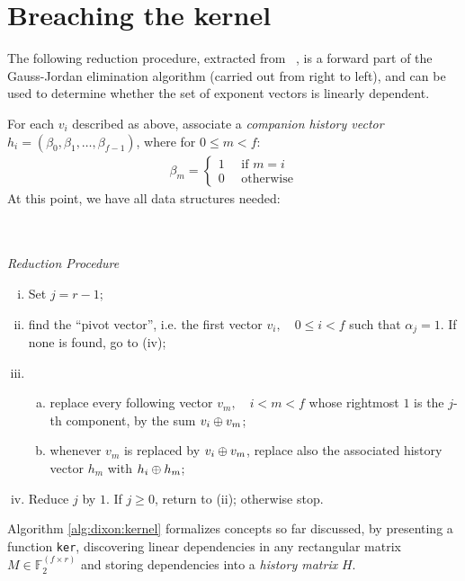 \section{Breaching the kernel}

The following reduction procedure, extracted from ~\cite{morrison-brillhart}, is
a forward part of the Gauss-Jordan elimination algorithm (carried out from right
to left), and can be used to determine whether the set of exponent vectors is
linearly dependent.

For each $v_i$ described as above, associate a \emph{companion history vector} \\
$h_i = (\beta_0, \beta_1, \ldots, \beta_{f-1})$, where for $0 \leq m < f$:
\begin{align*}
  \beta_m = \begin{cases}
    1 \quad \text{ if $m = i$} \\
    0 \quad \text{ otherwise}
    \end{cases}
\end{align*}
At this point, we have all data structures needed:
\\
\\
\\

\begin{center}
  \emph{Reduction Procedure}
\end{center}
\begin{enumerate}[(i)]
  \item Set $j=r-1$;
  \item find the ``pivot vector'', i.e. the first vector
    $v_i, \quad 0 \leq i < f$ such that $\alpha_j = 1$. If none is found, go
    to (iv);
  \item
    \begin{enumerate}[(a)]
      \item replace every following vector $v_m, \quad i < m < f$
        whose rightmost $1$ is the $j$-th component, by the sum $v_i \oplus v_m$;
      \item whenever $v_m$ is replaced by $v_i \oplus v_m$, replace also the
        associated history vector $h_m$ with $h_i \oplus h_m$;
    \end{enumerate}
  \item Reduce $j$ by $1$. If $j \geq 0$, return to (ii); otherwise stop.
\end{enumerate}

Algorithm \ref{alg:dixon:kernel} formalizes concepts so far discussed, by
presenting a function \texttt{ker}, discovering linear dependencies in any
rectangular matrix $M \in \mathbb{F}_2^{(f \times r)}$
and storing dependencies into a \emph{history matrix} $H$.

